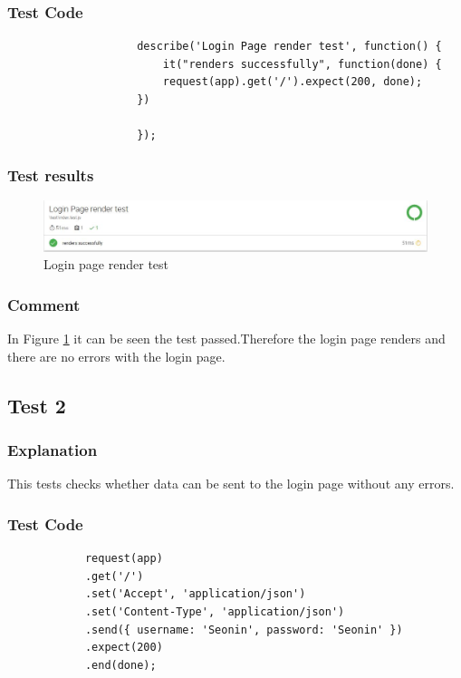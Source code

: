 \documentclass[]{article}
\begin{document}
			\subsubsection{Test Code}
				\begin{verbatim}
					describe('Login Page render test', function() {
						it("renders successfully", function(done) {
						request(app).get('/').expect(200, done);
					})
					
					});
				\end{verbatim}
			\subsubsection{Test results}
			\begin{figure}[h]
    			\centering
    		    \includegraphics[width=1\linewidth]{Graphics/MochaTest1.JPG}
    			\caption{Login page render test}
    			\label{fig:loginTestRender}
	 	    \end{figure}
		
						\subsubsection{Comment}
				In Figure \ref{fig:loginTestRender} it can be seen the test passed.Therefore the login page renders and there are no errors with the login page.
			
		\subsection{Test 2}
		\subsubsection{ Explanation }
		This tests checks whether data can be sent to the login page without any errors.\linebreak
		
		\subsubsection{Test Code}
			\begin{verbatim}
			request(app)
			.get('/')
			.set('Accept', 'application/json')
			.set('Content-Type', 'application/json')
			.send({ username: 'Seonin', password: 'Seonin' })
			.expect(200)
			.end(done);
			\end{verbatim}
			
\end{document}
